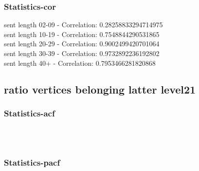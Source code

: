 \documentclass{article}%
\begin{document}
%
\newpage%
\subsubsection{Statistics{-}cor}%
\label{ssubsec:Statistics{-}cor}%
\noindent%
sent length 02-09 - Correlation: 0.28258833294714975\\%
sent length 10-19 - Correlation: 0.7548844290531865\\%
sent length 20-29 - Correlation: 0.9002499420701064\\%
sent length 30-39 - Correlation: 0.9732892236192802\\%
sent length 40+ - Correlation: 0.7953466281820868\\

%
\newpage

%
\subsection{ratio vertices belonging latter level21}%
\label{subsec:ratioverticesbelonginglatterlevel21}%
\subsubsection{Statistics{-}acf}%
\label{ssubsec:Statistics{-}acf}%


\begin{figure}[ht]%
\centering%
\setlength{\abovecaptionskip}{-35pt}%
%
%
\\%
%
%
\\%
%
\end{figure}

%
\newpage%
\subsubsection{Statistics{-}pacf}%
\label{ssubsec:Statistics{-}pacf}%
\end{document}
